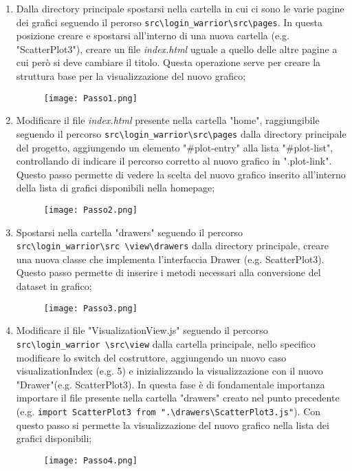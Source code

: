 \begin{enumerate}
    \item Dalla directory principale spostarsi nella cartella in cui ci sono le varie pagine dei grafici seguendo il perorso \texttt{src\textbackslash login\_warrior\textbackslash src\textbackslash pages}. In questa posizione creare e spostarsi all'interno di una nuova cartella (e.g. "ScatterPlot3"), creare un file \textit{index.html} uguale a quello delle altre pagine a cui però si deve cambiare il titolo. Questa operazione serve per creare la struttura base per la visualizzazione del nuovo grafico; 
    \begin{figure}[H]
        \centering
        \texttt{[image: Passo1.png]}
      \end{figure}

    \item Modificare il file \textit{index.html} presente nella cartella "home", raggiungibile seguendo il percorso \texttt{src\textbackslash login\_warrior\textbackslash src\textbackslash pages} dalla directory principale del progetto, aggiungendo un elemento "\#plot-entry" alla lista "\#plot-list", controllando di indicare il percorso corretto al nuovo grafico in ".plot-link". Questo passo permette di vedere la scelta del nuovo grafico inserito all'interno della lista di grafici disponibili nella homepage;
    \begin{figure}[H]
        \centering
        \texttt{[image: Passo2.png]}
      \end{figure}

    \item Spostarsi nella cartella "drawers" seguendo il percorso \texttt{src\textbackslash login\_warrior\textbackslash src \textbackslash view\textbackslash drawers} dalla directory principale, creare una nuova classe che implementa l'interfaccia Drawer (e.g. ScatterPlot3). Questo passo permette di inserire i metodi necessari alla conversione del dataset in grafico;
    \begin{figure}[H]
        \centering
        \texttt{[image: Passo3.png]}
      \end{figure}

    \item Modificare il file "VisualizationView.js" seguendo il percorso \texttt{src\textbackslash login\_warrior \textbackslash src\textbackslash view} dalla cartella principale, nello specifico modificare lo switch del costruttore, aggiungendo un nuovo caso visualizationIndex (e.g. 5) e inizializzando la visualizzazione con il nuovo "Drawer"(e.g. ScatterPlot3). In questa fase è di fondamentale importanza importare il file presente nella cartella "drawers" creato nel punto precedente (e.g. \texttt{import ScatterPlot3 from ".\textbackslash drawers\textbackslash ScatterPlot3.js"}). Con questo passo si permette la visualizzazione del nuovo grafico nella lista dei grafici disponibili;
    \begin{figure}[H]
        \centering
        \texttt{[image: Passo4.png]}
      \end{figure}


\end{enumerate}
